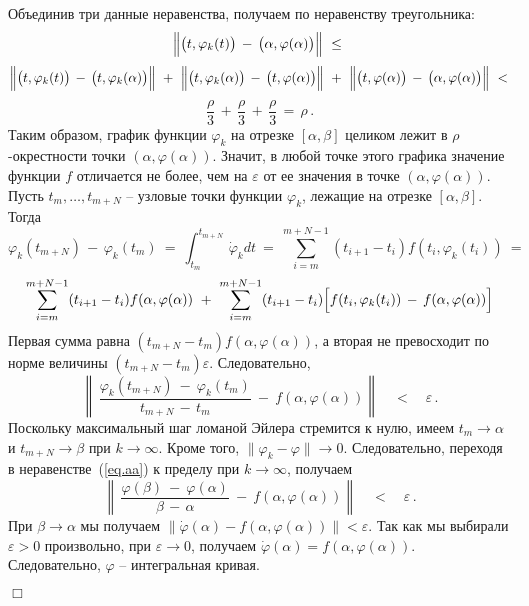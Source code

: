 \documentclass[12pt,a4paper]{article}
\begin{document}
\noindent Объединив три данные неравенства, получаем по неравенству треугольника:  
$$
\Bigl\| \bigl(t, \varphi_k(t) \bigr)\, - \,  \bigl(\alpha, \varphi (\alpha) \bigr) \Bigr\| \ \le \ 
$$
$$
\Bigl\| \bigl(t, \varphi_k(t) \bigr)\, - \,  \bigl(t, \varphi_k (\alpha) \bigr) \Bigr\| \ + \ 
\Bigl\| \bigl(t, \varphi_k(\alpha) \bigr)\, - \,  \bigl(t, \varphi (\alpha) \bigr) \Bigr\| \ + \ 
\Bigl\| \bigl(t, \varphi(\alpha) \bigr)\, - \,  \bigl(\alpha, \varphi (\alpha) \bigr) \Bigr\| \ < \, 
$$
$$
\frac{\rho}{3}\, + \, \frac{\rho}{3} \, + \, \frac{\rho}{3}\, = \, \rho\, .
$$ 
Таким образом, график функции $\varphi_k$ на отрезке $[\alpha, \beta]$ целиком лежит в $\rho$-окрестности точки
$(\alpha, \varphi(\alpha))$. Значит, в  любой точке этого графика значение функции $f$
отличается не более, чем на $\varepsilon$ от ее значения в точке $(\alpha, \varphi(\alpha))$.
Пусть $t_m, \ldots , t_{m+N}$ -- узловые точки функции $\varphi_k$, лежащие на отрезке $[\alpha, \beta]$. Тогда
$$
\varphi_k(t_{m+N}) \, - \, \varphi_k(t_{m}) \ = \ \int_{t_m}^{t_{m+N}}\, \dot \varphi_k dt \ = \
\sum_{i=m}^{m+N-1} (t_{i+1} - t_i)f(t_i, \varphi_k(t_i)) \ = \
$$
$$
\sum_{i=m}^{m+N-1} (t_{i+1} - t_i)f(\alpha, \varphi (\alpha)) \ + \
\sum_{i=m}^{m+N-1} (t_{i+1} - t_i)\Bigl[f(t_i, \varphi_k(t_i)) \, - \, f(\alpha, \varphi (\alpha))\Bigr]
$$
  Первая сумма равна $(t_{m+N} - t_m)f(\alpha, \varphi (\alpha))$, а вторая не превосходит по норме
 величины  $(t_{m+N} - t_m)\varepsilon$. Следовательно,
\begin{equation}\label{eq.aa}
\left\|\, \frac{\varphi_k(t_{m+N}) \ - \ \varphi_k(t_{m})}{t_{m+N} \, - \, t_m} \ - \
f(\alpha, \varphi(\alpha)) \right\| \quad < \quad \varepsilon \, .
\end{equation}
Поскольку максимальный шаг ломаной Эйлера стремится к нулю, имеем $t_{m} \to \alpha$ и $t_{m+N} \to \beta$
при $k \to \infty$. Кроме того, $\|\varphi_k - \varphi\| \to 0$.
Следовательно, переходя в неравенстве~(\ref{eq.aa}) к пределу при $k \to \infty$, получаем
$$
\left\|\, \frac{\varphi(\beta) \ - \ \varphi(\alpha)}{\beta \, - \, \alpha} \ - \
f(\alpha, \varphi(\alpha)) \right\| \quad < \quad \varepsilon \, .
$$
При $\beta \to \alpha$ мы получаем $\|\dot \varphi(\alpha) - f(\alpha, \varphi(\alpha))\| <  \varepsilon$.
Так как мы выбирали $\varepsilon >0$ произвольно, при
$\varepsilon \to 0$, получаем
$\dot \varphi(\alpha) = f(\alpha, \varphi(\alpha))$. Следовательно, $\varphi$ -- интегральная кривая.


   {\hfill $\Box$}
\medskip
\end{document}
